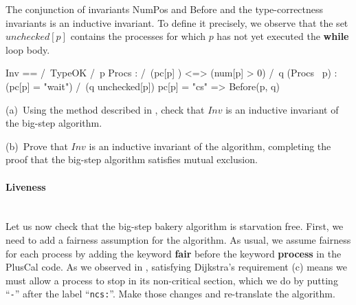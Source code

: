 \documentclass[fleqn,leqno]{article}
\begin{document}
%
The conjunction of invariants NumPos and Before and the
type-correctness invariants is an inductive invariant.  To define it
precisely, we observe that the set $unchecked[p]$
contains the processes for which $p$ has not yet executed the
\textbf{while} loop body.  
% 
% 
\begin{display}
\begin{notla}
Inv == /\ TypeOK
       /\ \A p \in Procs : 
             /\ (pc[p] ) <=> (num[p] > 0) 
             /\ \A q \in (Procs \ {p}) :
                   \/ (pc[p] = "wait") /\ (q \notin unchecked[p])
                   \/ pc[p] = "cs" 
                   => Before(p, q)
\end{notla}
\begin{tlatex}
%
%
%
%
%
\end{tlatex}
\end{display}
\begin{problem}
(a)~Using the method described in 
  ,
check that $Inv$ is an inductive invariant of the big-step algorithm.

(b)~Prove that $Inv$ is an inductive invariant of the algorithm,
completing the proof that the big-step algorithm satisfies mutual
exclusion.
\end{problem}

\paragraph{Liveness}\mbox{}\\
%
Let us now check that the big-step bakery algorithm is starvation
free.  First, we need to add a fairness assumption for the algorithm.
As usual, we assume fairness for each process by adding the keyword
\textbf{fair} before the keyword \textbf{process} in the PlusCal code.
As we observed in
  ,
satisfying Dijkstra's requirement (c) means we must allow a process to
stop in its non-critical section, which we do by putting
``\texttt{-}'' after the label ``\texttt{ncs:}''.  Make those changes
and re-translate the algorithm.
\end{document}

